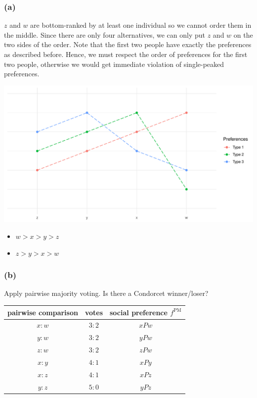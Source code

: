 \documentclass[a4paper]{article}
\begin{document}
\subsubsection*{(a)}

$z$ and $w$ are bottom-ranked by at least one individual so we cannot order them in the middle. Since there are only four alternatives, we can only put $z$ and $w$ on the two sides of the order. Note that the first two people have exactly the preferences as described before. Hence, we must respect the order of preferences for the first two people, otherwise we would get immediate violation of single-peaked preferences.

\begin{center}
    \includegraphics[scale=0.5]{images/Ex3.7(a).pdf}
\end{center}

\begin{itemize}
    \item $w>x>y>z$
    \item $z>y>x>w$
\end{itemize}

\subsubsection*{(b)}

Apply pairwise majority voting. Is there a Condorcet winner/loser?

\begin{table}[!htbp]
    \centering
    \begin{tabular}{ccc}
    pairwise comparison & votes & social preference $f^\text{PM}$  \\
    \hline 
    $x:w$               & $3:2$ & $xPw$                            \\
    $y:w$               & $3:2$ & $yPw$                            \\
    $z:w$               & $3:2$ & $zPw$                            \\
    $x:y$               & $4:1$ & $xPy$                            \\
    $x:z$               & $4:1$ & $xPz$                            \\
    $y:z$               & $5:0$ & $yPz$                            \\
    \hline
    \end{tabular}
\end{table}
\end{document}
